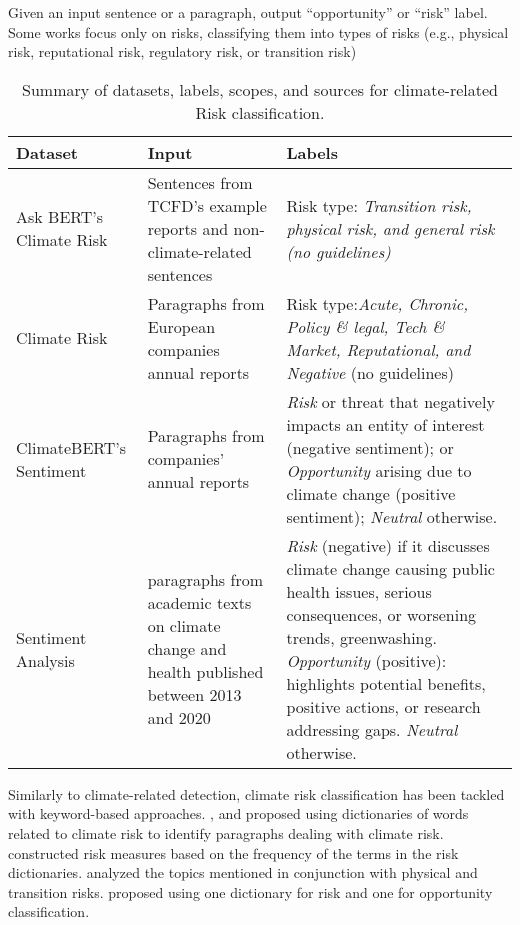 \task Given an input sentence or a paragraph, output ``opportunity'' or ``risk'' label. Some works focus only on risks, classifying them into types of risks (e.g., physical risk, reputational risk, regulatory risk, or transition risk)

\begin{table}[ht]
\centering
\begin{tabular}{p{2cm}p{4cm}p{3cm}p{4cm}}
\toprule
\textbf{Dataset} & \textbf{Input}   &  \textbf{Labels}                                                                                  &                                       \\
\midrule
Ask BERT's Climate Risk \cite{kolbel_ask_2021} & Sentences from TCFD's example reports and non-climate-related sentences &  \multicolumn{2}{p{8cm}}{Risk type: \textit{Transition risk, physical risk, and general risk (no guidelines)}}             \\ \midrule
Climate Risk \cite{Friederich_climate_risk_disclosure} & Paragraphs from European companies annual reports & \multicolumn{2}{p{8cm}}{Risk type:\textit{Acute, Chronic, Policy \& legal, Tech \& Market, Reputational, and Negative} (no guidelines)}       \\ \midrule
ClimateBERT's Sentiment \cite{bingler2023cheaptalkspecificitysentiment}  & Paragraphs from companies' annual reports            & \multicolumn{2}{p{8cm}}{\textit{Risk} or threat that negatively impacts an entity of interest (negative sentiment); or \textit{Opportunity} arising due to climate change (positive sentiment); \textit{Neutral} otherwise.} \\ \midrule
Sentiment Analysis \cite{xiang_dare_2023} & paragraphs from academic texts on climate change and health published between 2013 and 2020  & \multicolumn{2}{p{8cm}}{\textit{Risk} (negative) if it discusses climate change causing public health issues, serious consequences, or worsening trends, greenwashing. \textit{Opportunity} (positive): highlights potential benefits, positive actions, or research addressing gaps. \textit{Neutral} otherwise.} \\
\bottomrule
\end{tabular}
\caption{Summary of datasets, labels, scopes, and sources for climate-related Risk classification.}
\label{tab:datasets_risk}
\end{table}


\zeroshot Similarly to climate-related detection, climate risk classification has been tackled with keyword-based approaches. \citet{liCorporateClimateRisk2020}, \citet{kheradmand2021a} and \citet{chou_ESG} proposed using dictionaries of words related to climate risk to identify paragraphs dealing with climate risk. \citet{liCorporateClimateRisk2020} constructed risk measures based on the frequency of the terms in the risk dictionaries. \citet{chou_ESG} analyzed the topics mentioned in conjunction with physical and transition risks. \citet{SAUTNER_cliamte_change_exp} proposed using one dictionary for risk and one for opportunity classification.

